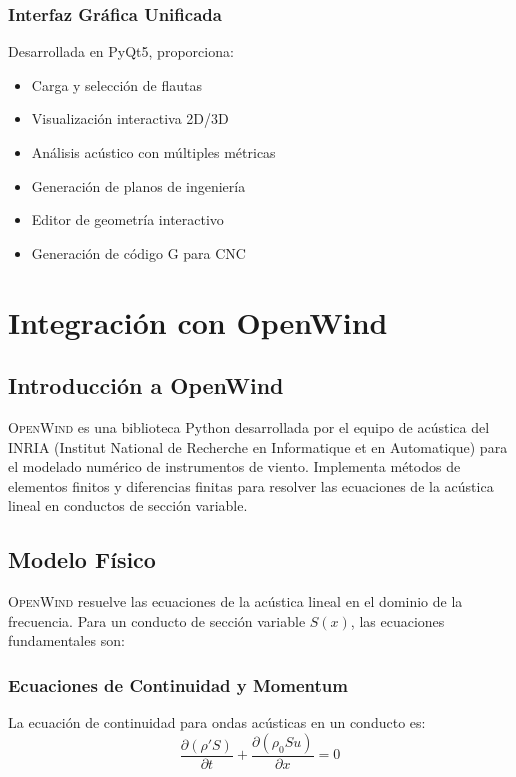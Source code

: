 \documentclass[12pt,a4paper,twocolumn]{article}
\newcommand{\openwind}{\textsc{OpenWind}}
\begin{document}
\subsubsection{Interfaz Gráfica Unificada}

Desarrollada en PyQt5, proporciona:
\begin{itemize}
    \item Carga y selección de flautas
    \item Visualización interactiva 2D/3D
    \item Análisis acústico con múltiples métricas
    \item Generación de planos de ingeniería
    \item Editor de geometría interactivo
    \item Generación de código G para CNC
\end{itemize}

\section{Integración con OpenWind}

\subsection{Introducción a OpenWind}

\openwind{} es una biblioteca Python desarrollada por el equipo de acústica del INRIA (Institut National de Recherche en Informatique et en Automatique) para el modelado numérico de instrumentos de viento. Implementa métodos de elementos finitos y diferencias finitas para resolver las ecuaciones de la acústica lineal en conductos de sección variable.

\subsection{Modelo Físico}

\openwind{} resuelve las ecuaciones de la acústica lineal en el dominio de la frecuencia. Para un conducto de sección variable $S(x)$, las ecuaciones fundamentales son:

\subsubsection{Ecuaciones de Continuidad y Momentum}

La ecuación de continuidad para ondas acústicas en un conducto es:
\begin{equation}
\frac{\partial (\rho' S)}{\partial t} + \frac{\partial (\rho_0 S u)}{\partial x} = 0
\label{eq:continuidad}
\end{equation}
\end{document}
